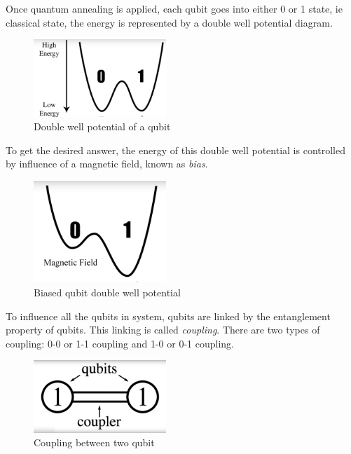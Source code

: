 \documentclass[12pt,conference]{IEEEtran}
\begin{document}
Once quantum annealing is applied, each qubit goes into either 0 or 1 state, ie classical state, the energy is represented by a double well potential diagram.
 
\begin{figure}[h]
  \centering
  \includegraphics[width=5cm]{qubit_energy.png}
  \caption{Double well potential of a qubit}
  \label{fig:DQPQbit}
\end{figure}

To get the desired answer, the energy of this double well potential is controlled by influence of a magnetic field, known as \emph{bias}. 
 
\begin{figure}[h]
  \centering
  \includegraphics[width=5cm]{qubit_mag.png}
  \caption{Biased qubit double well potential}
  \label{fig:BDQPQbit}
\end{figure}
 
To influence all the qubits in system, qubits are linked by the entanglement property of qubits. This linking is called \emph{coupling}. There are two types of coupling: 0-0 or 1-1 coupling and 1-0 or 0-1 coupling. 

\begin{figure}[h]
  \centering
  \includegraphics[width=5cm]{qubit_couplet.png}
  \caption{Coupling between two qubit}
  \label{fig:QbitC}
\end{figure}
\end{document}
